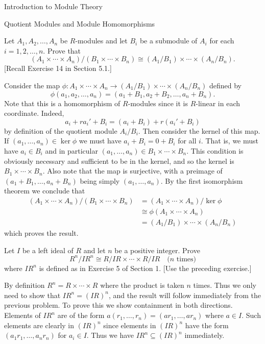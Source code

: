 \begin{chapter}{Introduction to Module Theory}
\begin{section}{Quotient Modules and Module Homomorphisms}
\begin{problem}\label{ex:10.2.11}
Let $A_1,A_2,\ldots, A_n$ be $R$-modules and let $B_i$ be a submodule of $A_i$ for each $i=1,2,\ldots,n$. Prove that \[
(A_1\times\cdots \times A_n)/(B_1\times \cdots \times B_n) \cong (A_1/B_1)\times \cdots \times (A_n/B_n).
\] [Recall Exercise 14 in Section 5.1.]
\end{problem}
\begin{solution}
Consider the map $\phi: A_1\times\cdots \times A_n \to (A_1/B_1)\times \cdots \times (A_n/B_n)$ defined by \[
\phi(a_1,a_2,\ldots, a_n) = (a_1+B_1, a_2+B_2,\ldots, a_n+B_n).
\]
Note that this is a homomorphism of $R$-modules since it is $R$-linear in each coordinate. Indeed, \[
a_i + ra_i' + B_i = (a_i+B_i) + r(a_i'+B_i)
\]
by definition of the quotient module $A_i/B_i$. Then consider the kernel of this map. If $(a_1,\ldots,a_n)\in \ker\phi$ we must have $a_i + B_i = 0+B_i$ for all $i$. That is, we must have $a_i\in B_i$ and in particular $(a_1,\ldots,a_n)\in B_1\times\cdots\times B_n$. This condition is obviously necessary and sufficient to be in the kernel, and so the kernel is  $B_1\times\cdots\times B_n$. Also note that the map is surjective, with a preimage of $(a_1+B_1,\ldots, a_n+B_n)$ being simply $(a_1,\ldots, a_n)$. By the first isomorphism theorem we conclude that \begin{align*}
(A_1\times\cdots \times A_n)/(B_1\times \cdots \times B_n) &= (A_1\times\cdots \times A_n)/\ker\phi \\
& \cong \phi(A_1\times\cdots \times A_n)\\
& = (A_1/B_1)\times \cdots \times (A_n/B_n)
\end{align*}
which proves the result.
\end{solution}\oneperpage



\begin{problem}\label{ex:10.2.12}
Let $I$ be a left ideal of $R$ and let $n$ be a positive integer. Prove \[
R^n/IR^n \cong R/IR\times\cdots\times R/IR \quad \text{($n$ times)}
\]
where $IR^n$ is defined as in Exercise 5 of Section 1. [Use the preceding exercise.]
\end{problem}
\begin{solution}
By definition $R^n = R\times \cdots\times R$ where the product is taken $n$ times. Thus we only need to show that $IR^n = (IR)^n$, and the result will follow immediately from the previous problem. To prove this we show containment in both directions. Elements of $IR^n$ are of the form $a(r_1,\ldots, r_n) = (ar_1,\ldots, ar_n)$ where $a\in I$. Such elements are clearly in $(IR)^n$ since elements in $(IR)^n$ have the form $(a_1r_1,\ldots, a_nr_n)$ for $a_i\in I$. Thus we have $IR^n\subseteq (IR)^n$ immediately.


\end{solution}
\end{section}
\end{chapter}
